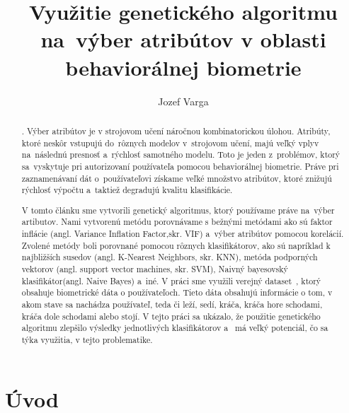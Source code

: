 \documentclass[runningheads]{llncs}
\newcommand\tab[1][0.5cm]{\hspace*{#1}}
\begin{document}
%
\title{Využitie genetického algoritmu na~výber atribútov v oblasti behaviorálnej biometrie}
%
%
\author{Jozef Varga}
%
%
\maketitle              %
%
\begin{abstract}
    . Výber atribútov je v strojovom učení náročnou kombinatorickou úlohou. 
    Atribúty, ktoré neskôr vstupujú do~rôznych modelov v~strojovom učení, majú
    veľký vplyv na~následnú presnosť a~rýchlosť samotného modelu. Toto je jeden z~problémov,
    ktorý sa~vyskytuje pri autorizovaní používateľa pomocou behaviorálnej biometrie. Práve pri
    zaznamenávaní dát o~používateľovi získame veľké množstvo atribútov, ktoré znižujú rýchlosť výpočtu
    a~taktiež degradujú kvalitu klasifikácie. 
    
    \tab V tomto článku sme vytvorili genetický algoritmus, ktorý používame práve na~výber artibutov. Nami vytvorenú
    metódu porovnávame s bežnými metódami ako sú faktor inflácie (angl. Variance Inflation Factor,skr. VIF) a~výber atribútov pomocou korelácií. 
    Zvolené metódy boli porovnané pomocou rôznych klasifikátorov, ako sú napríklad k najbližších susedov (angl. K-Nearest Neighbors, skr. KNN), metóda podporných vektorov (angl. support vector machines, skr. SVM), Naivný bayesovský klasifikátor(angl. Naive Bayes) a~iné. 
    V práci sme využili verejný dataset~\cite{ref_dataset_anguita,ref_dataset}, ktorý obsahuje biometrické dáta o 
    používateľoch. Tieto dáta obsahujú informácie o tom, v akom stave sa nachádza používateľ, teda či leží, sedí, 
    kráča,  kráča hore schodami, kráča dole schodami alebo stojí.
    V tejto práci sa ukázalo, že použitie genetického algoritmu zlepšilo výsledky jednotlivých klasifikátorov a~
    má veľký potenciál, čo sa týka využitia, v tejto problematike.

\end{abstract}
%

\section{Úvod}
\end{document}
